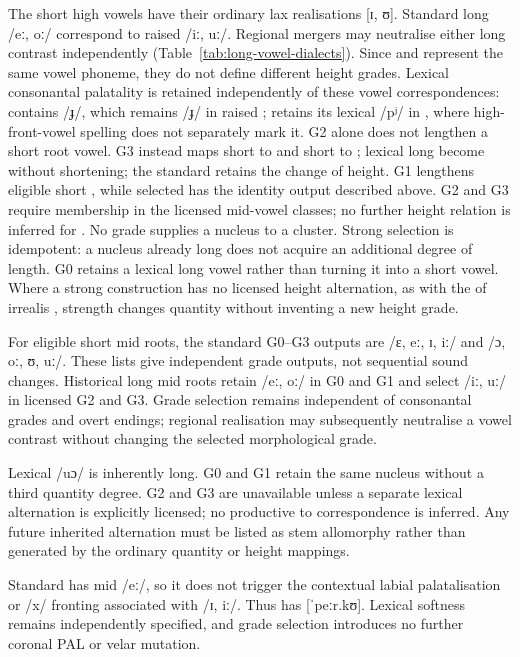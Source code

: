 The short high vowels have their ordinary lax realisations [ɪ, ʊ].
Standard long /eː, oː/ correspond to raised /iː, uː/.
Regional mergers may neutralise either long contrast independently
(Table~\ref{tab:long-vowel-dialects}). Since  and  represent the same vowel
phoneme, they do not define different height grades. Lexical consonantal
palatality is retained independently of these vowel correspondences:  contains /ɟ/, which remains /ɟ/ in
raised ;  retains its lexical /pʲ/ in
, where high-front-vowel spelling does not separately mark it.
G2 alone does not lengthen a short root vowel. G3 instead maps short
 to  and short
 to ; lexical long  become  without
shortening; the standard retains the change of height.
G1 lengthens eligible short , while selected
 has the identity output described above. G2 and G3
require membership in the licensed mid-vowel classes; no further height relation is
inferred for . No grade supplies a nucleus to a cluster.
Strong selection is idempotent: a nucleus already long does not acquire an
additional degree of length. G0 retains a lexical long vowel rather than
turning it into a short vowel. Where a strong construction
has no licensed height alternation, as with the  of irrealis
, strength changes quantity without inventing a new height grade.

For eligible short mid roots, the standard G0--G3 outputs are
/ɛ, eː, ɪ, iː/ and /ɔ, oː, ʊ, uː/. These lists give independent grade
outputs, not sequential sound changes. Historical long mid roots retain
/eː, oː/ in G0 and G1 and select /iː, uː/ in licensed G2 and G3.
Grade selection remains independent of consonantal grades and overt endings;
regional realisation may subsequently neutralise a vowel contrast without
changing the selected morphological grade.

Lexical  /uɔ/ is inherently long. G0 and G1 retain the same
nucleus without a third quantity degree. G2 and G3 are unavailable unless a
separate lexical alternation is explicitly licensed; no productive
 to  correspondence is inferred. Any future inherited
alternation must be listed as stem allomorphy rather than generated by the
ordinary quantity or height mappings.

Standard  has mid /eː/, so it does not trigger the contextual
labial palatalisation or /x/ fronting associated with /ɪ, iː/.
Thus  has [ˈpeːr.kʊ]. Lexical softness remains independently
specified, and grade selection introduces no further coronal PAL or velar
mutation.

